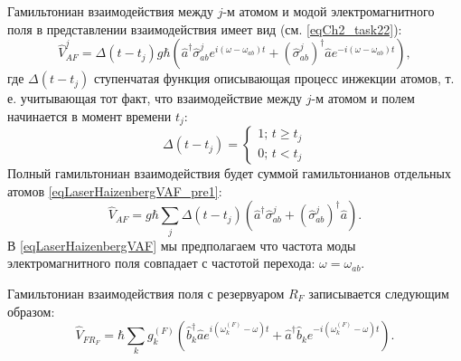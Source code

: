 Гамильтониан взаимодействия между $j$-м атомом и модой
электромагнитного поля в представлении
взаимодействия имеет вид (см. \ref{eqCh2_task22}):
\begin{equation}
\hat{V}_{AF}^j =
\Delta\left(t - t_j\right) 
g \hbar \left(
\hat{a}^{\dag}\hat{\sigma}^{j}_{ab} e^{i \left(\omega -
  \omega_{ab}\right)t} +
\left(\hat{\sigma}^{j}_{ab}\right)^{\dag} 
\hat{a} e^{-i \left(\omega - \omega_{ab}\right)t}
\right),
\label{eqLaserHaizenbergVAF_pre1}
\end{equation}
где $\Delta\left(t - t_j\right)$ ступенчатая функция описывающая
процесс инжекции атомов, т. е. учитывающая тот факт, что
взаимодействие между $j$-м атомом и полем начинается в момент времени $t_j$:
\begin{equation}
\Delta\left(t - t_j\right) =
\left\{
\begin{array}{c}
1;\, t \ge t_j \\
0;\, t < t_j 
\end{array}
\right.
\nonumber
\end{equation}
Полный гамильтониан взаимодействия будет суммой гамильтонианов
отдельных атомов
\eqref{eqLaserHaizenbergVAF_pre1}:
\begin{equation}
\hat{V}_{AF} =
g \hbar
\sum_j
\Delta\left(t - t_j\right) 
 \left(
\hat{a}^{\dag}\hat{\sigma}^{j}_{ab}  +
\left(\hat{\sigma}^{j}_{ab}\right)^{\dag} 
\hat{a}
\right).
\label{eqLaserHaizenbergVAF}
\end{equation}
В \eqref{eqLaserHaizenbergVAF} мы предполагаем что частота моды
электромагнитного поля совпадает с частотой перехода: $\omega =
\omega_{ab}$.

Гамильтониан взаимодействия поля с резервуаром $R_F$ записывается
следующим образом: 
\begin{equation}
\hat{V}_{FR_F} =
\hbar
\sum_k
g_k^{(F)}
 \left(
\hat{b}_k^{\dag}\hat{a} e^{i\left(\omega_k^{(F)} - \omega\right)t} +
\hat{a}^{\dag}\hat{b}_k e^{-i\left(\omega_k^{(F)} - \omega\right)t}
\right).
\label{eqLaserHaizenbergVFRF}
\end{equation}


